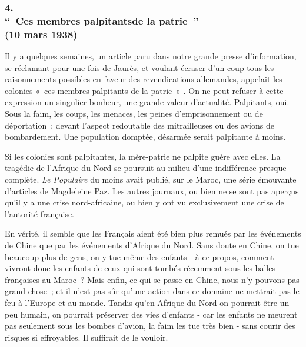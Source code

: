 \documentclass[french,twoside]{book} %
\begin{document}
\subsubsection[4. “ Ces membres palpitantsde la patrie ”, (10 mars 1938)]{4. \\
“ Ces membres palpitantsde la patrie ” \\
(10 mars 1938)}
\noindent \par
Il y a quelques semaines, un article paru dans notre grande presse d'information, se réclamant pour une fois de Jaurès, et voulant écraser d'un coup tous les raisonnements possibles en faveur des revendications alleman­des, appelait les colonies « ces membres palpitants de la patrie » . On ne peut refuser à cette expression un singulier bonheur, une grande valeur d'actualité. Palpitants, oui. Sous la faim, les coups, les menaces, les peines d'emprisonne­ment ou de déportation ; devant l'aspect redoutable des mitrailleuses ou des avions de bombardement. Une population domptée, désarmée serait palpitante à moins.\par
Si les colonies sont palpitantes, la mère-patrie ne palpite guère avec elles. La tragédie de l'Afrique du Nord se poursuit au milieu d'une indifférence presque complète. {\itshape Le Populaire} du moins avait publié, sur le Maroc, une série émouvante d'articles de Magdeleine Paz. Les autres journaux, ou bien ne se sont pas aperçus qu'il y a une crise nord-africaine, ou bien y ont vu exclu­sivement une crise de l'autorité française.\par
En vérité, il semble que les Français aient été bien plus remués par les événements de Chine que par les événements d'Afrique du Nord. Sans doute en Chine, on tue beaucoup plus de gens, on y tue même des enfants - à ce propos, comment vivront donc les enfants de ceux qui sont tombés récemment sous les balles françaises au Maroc ? Mais enfin, ce qui se passe en Chine, nous n'y pouvons pas grand-chose ; et il n'est pas sûr qu'une action dans ce domaine ne mettrait pas le feu à l'Europe et au monde. Tandis qu'en Afrique du Nord on pourrait être un peu humain, on pourrait préserver des vies d'enfants - car les enfants ne meurent pas seulement sous les bombes d'avion, la faim les tue très bien - sans courir des risques si effroyables. Il suffirait de le vouloir.\par
\end{document}
